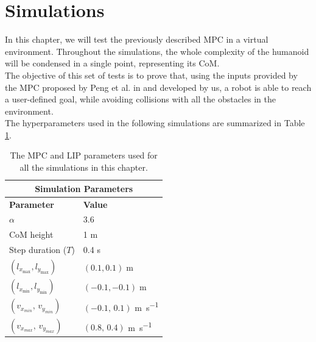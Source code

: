\section{Simulations}\label{sec:simulations}

In this chapter, we will test the previously described MPC in a virtual environment. Throughout the simulations, the whole complexity of the humanoid will be condensed in a single point, representing its CoM.\\
The objective of this set of tests is to prove that, using the inputs provided by the MPC proposed by Peng et al. in \cite{peng_main_paper} and developed by us, a robot is able to reach a user-defined goal, while avoiding collisions with all the obstacles in the environment.\\
The hyperparameters used in the following simulations are summarized in Table \ref{table:sim_params}.

\begin{table}[h]
        \begin{tabular}{ |p{4cm}||p{4cm}| }
             \hline
             \multicolumn{2}{|c|}{Simulation Parameters} \\
             \hline
             \textbf{Parameter} & \textbf{Value}\\
             \hline
             $\alpha$   & 3.6 \\
             CoM height & 1 \si{\meter} \\
             Step duration ($T$) & 0.4 \si{\second} \\
             $\left( l_{x_{\max}}, l_{y_{\max}} \right)$ & $\left( 0.1, 0.1 \right)  \;\si{\meter}$ \\
             $\left( l_{x_{\min}}, l_{y_{\min}} \right)$ & $\left( -0.1, -0.1 \right)  \;\si{\meter}$ \\
             $\left( v_{x_{min}},\, v_{y_{min}} \right)$ & $\left( -0.1,\, 0.1 \right)$ \si{\meter\per\second}\\
             $\left( v_{x_{max}},\, v_{y_{max}} \right)$ & $\left( 0.8,\, 0.4 \right)$ \si{\meter\per\second}\\
             \hline
        \end{tabular}
    \centering
    \caption{The MPC and LIP parameters used for all the simulations in this chapter.}
    \label{table:sim_params}
\end{table}

